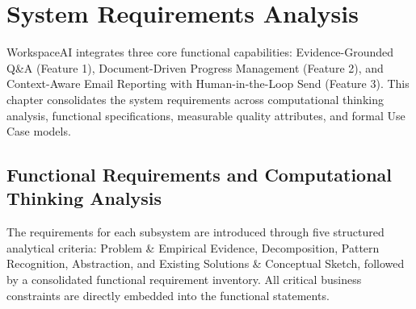 




\chapter{System Requirements Analysis}

\label{chap:system-requirements}



WorkspaceAI integrates three core functional capabilities: Evidence-Grounded Q\&A (Feature 1), Document-Driven Progress Management (Feature 2), and Context-Aware Email Reporting with Human-in-the-Loop Send (Feature 3). This chapter consolidates the system requirements across computational thinking analysis, functional specifications, measurable quality attributes, and formal Use Case models.






\section{Functional Requirements and Computational Thinking Analysis}

\label{sec:functional-requirements}



The requirements for each subsystem are introduced through five structured analytical criteria: Problem \& Empirical Evidence, Decomposition, Pattern Recognition, Abstraction, and Existing Solutions \& Conceptual Sketch, followed by a consolidated functional requirement inventory. All critical business constraints are directly embedded into the functional statements.






